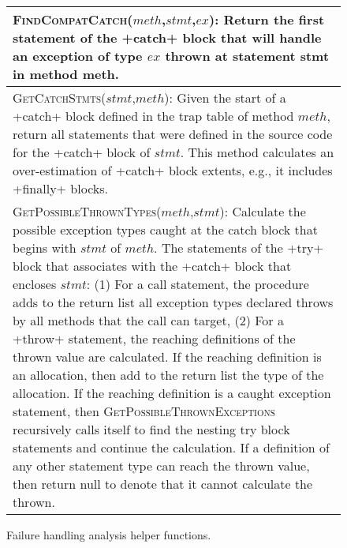 \begin{figure}[t]
\scriptsize
\renewcommand*{\arraystretch}{1.3}
\begin{tabular}{|p{3.3in}|}
\hline 

\textsc{FindCompatCatch}($meth$,$stmt$,$ex$): Return the first
  statement of the +catch+ block that will handle an
  exception of type $ex$ thrown at statement stmt in method meth.
\\
\hline
\textsc{GetCatchStmts}($stmt$,$meth$): Given the start of a
+catch+ block defined in the trap table of method $meth$,
return all statements that were defined in the source code for the
+catch+ block of $stmt$.  This method calculates an
over-estimation of +catch+ block extents, e.g., it includes
+finally+ blocks.
\\
\hline
\textsc{GetPossibleThrownTypes}($meth$,$stmt$): Calculate the
possible exception types caught at the catch block that begins with
$stmt$ of $meth$. The statements of the +try+ block that associates with the +catch+ block
that encloses $stmt$:  (1) For a call statement, the
procedure adds to the return list all exception types declared throws
by all methods that the call can target,  (2) For a +throw+
statement, the reaching definitions of the thrown value are
calculated.  If the reaching definition is an allocation, then add to
the return list the type of the allocation.  If the reaching
definition is a caught exception statement, then
\textsc{GetPossibleThrownExceptions} recursively calls itself to find
the nesting try block statements and continue the calculation.  If a
definition of any other statement type can reach the thrown value,
then return null to denote that it cannot calculate the
thrown.  
\\
\hline
\end{tabular}
\caption{\label{fig:helper-funs}Failure handling analysis helper functions.}
\vspace{-0.1in}
\end{figure}

